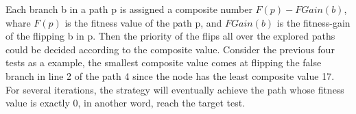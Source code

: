 \indent Each branch b in a path p is assigned a composite number $F(p)-FGain(b)$, whare $F(p)$ is the fitness value of the path p, and $FGain(b)$ is the fitness-gain of the flipping b in p. Then the priority of the flips all over the explored paths could be decided according to the composite value. Consider the previous four tests as a example, the smallest composite value comes at flipping the false branch in line 2 of the path 4 since the node has the least composite value 17. For several iterations, the strategy will eventually achieve the path whose fitness value is exactly 0, in another word, reach the target test.
